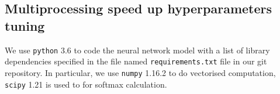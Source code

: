 

\subsection{Multiprocessing speed up hyperparameters tuning}
We use \texttt{python} 3.6 to code the neural network model with a list of library dependencies specified in the file named \texttt{requirements.txt} file in our git repository. 
In particular, we use \texttt{numpy} 1.16.2 to do vectorised computation, \texttt{scipy} 1.21 is used to for softmax calculation.

